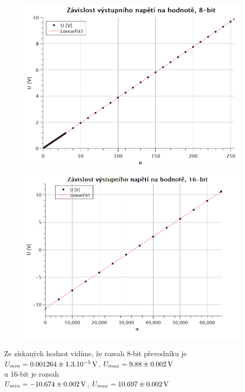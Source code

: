 \documentclass[czech,11pt,a4paper]{article}
\begin{document}
  	 \begin{figure}[H]\begin{center}
  	 		
   	\includegraphics{8bitzavislost}
   	\includegraphics{16bitzavislost}
  	 	\end{center}
   \end{figure}
    \noindent Ze získaných hodnot vidíme, že rozsah 8-bit převodníku je\\ $U_{min} = 0.001264 \pm 1.3.10^{-5} \,\rm V$, $U_{max} = 9.88 \pm 0.002 \,\rm V$ \\ u 16-bit je rozsah  \\ $U_{min} = -10.674 \pm 0.002 \,\rm V$, $U_{max} = 10.697 \pm 0.002 \,\rm V$
\end{document}
